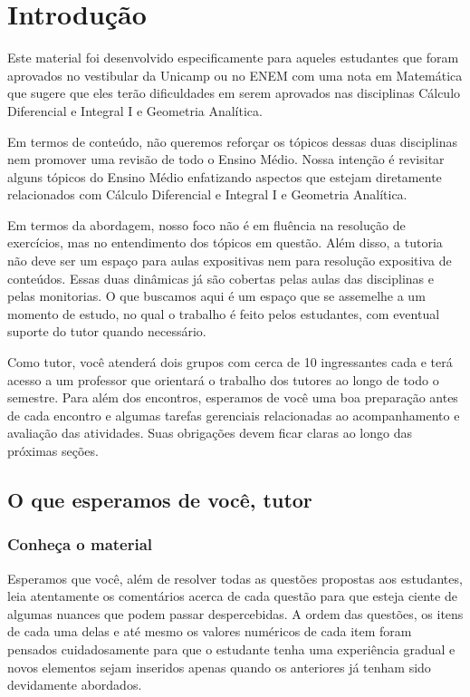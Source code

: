 % 

\chapter{Introdução}

\paraTutores

Este material foi desenvolvido especificamente para aqueles estudantes que foram aprovados no vestibular da Unicamp ou no ENEM com uma nota em Matemática que sugere que eles terão dificuldades em serem aprovados nas disciplinas Cálculo Diferencial e Integral I e Geometria Analítica.

Em termos de conteúdo, não queremos reforçar os tópicos dessas duas disciplinas nem promover uma revisão de todo o Ensino Médio. Nossa intenção é revisitar alguns tópicos do Ensino Médio enfatizando aspectos que estejam diretamente relacionados com Cálculo Diferencial e Integral I e Geometria Analítica.

Em termos da abordagem, nosso foco não é em fluência na resolução de exercícios, mas no entendimento dos tópicos em questão. Além disso, a tutoria não deve ser um espaço para aulas expositivas nem para resolução expositiva de conteúdos. Essas duas dinâmicas já são cobertas pelas aulas das disciplinas e pelas monitorias. O que buscamos aqui é um espaço que se assemelhe a um momento de estudo, no qual o trabalho é feito pelos estudantes, com eventual suporte do tutor quando necessário.

Como tutor, você atenderá dois grupos com cerca de 10 ingressantes cada e terá acesso a um professor que orientará o trabalho dos tutores ao longo de todo o semestre. Para além dos encontros, esperamos de você uma boa preparação antes de cada encontro e algumas tarefas gerenciais relacionadas ao acompanhamento e avaliação das atividades. Suas obrigações devem ficar claras ao longo das próximas seções.

\newpage
\section{O que esperamos de você, tutor}

\subsection{Conheça o material}

Esperamos que você, além de resolver todas as questões propostas aos estudantes, leia atentamente os comentários acerca de cada questão para que esteja ciente de algumas nuances que podem passar despercebidas. A ordem das questões, os itens de cada uma delas e até mesmo os valores numéricos de cada item foram pensados cuidadosamente para que o estudante tenha uma experiência gradual e novos elementos sejam inseridos apenas quando os anteriores já tenham sido devidamente abordados.


